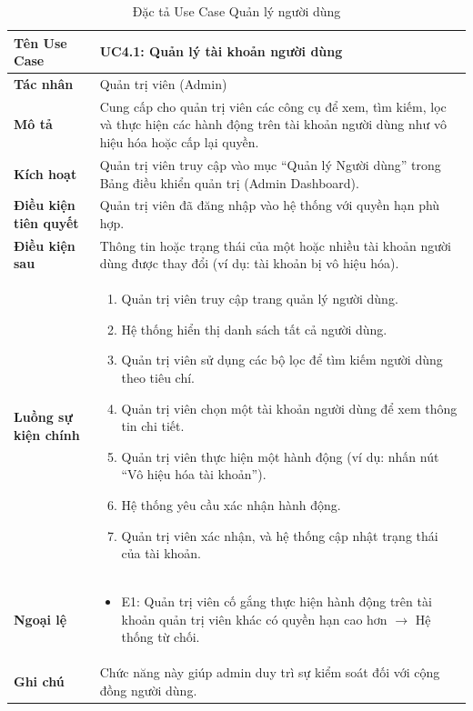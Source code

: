 \begin{table}[H]
\centering
\begin{tabularx}{\textwidth}{|l|X|}
\hline
\textbf{Tên Use Case} & \textbf{UC4.1: Quản lý tài khoản người dùng} \\ \hline
\textbf{Tác nhân} & Quản trị viên (Admin) \\ \hline
\textbf{Mô tả} & Cung cấp cho quản trị viên các công cụ để xem, tìm kiếm, lọc và thực hiện các hành động trên tài khoản người dùng như vô hiệu hóa hoặc cấp lại quyền. \\ \hline
\textbf{Kích hoạt} & Quản trị viên truy cập vào mục ``Quản lý Người dùng'' trong Bảng điều khiển quản trị (Admin Dashboard). \\ \hline
\textbf{Điều kiện tiên quyết} & Quản trị viên đã đăng nhập vào hệ thống với quyền hạn phù hợp. \\ \hline
\textbf{Điều kiện sau} & Thông tin hoặc trạng thái của một hoặc nhiều tài khoản người dùng được thay đổi (ví dụ: tài khoản bị vô hiệu hóa). \\ \hline
\textbf{Luồng sự kiện chính} & 
\begin{enumerate}
    \item Quản trị viên truy cập trang quản lý người dùng.
    \item Hệ thống hiển thị danh sách tất cả người dùng.
    \item Quản trị viên sử dụng các bộ lọc để tìm kiếm người dùng theo tiêu chí.
    \item Quản trị viên chọn một tài khoản người dùng để xem thông tin chi tiết.
    \item Quản trị viên thực hiện một hành động (ví dụ: nhấn nút ``Vô hiệu hóa tài khoản'').
    \item Hệ thống yêu cầu xác nhận hành động.
    \item Quản trị viên xác nhận, và hệ thống cập nhật trạng thái của tài khoản.
\end{enumerate} \\ \hline
\textbf{Ngoại lệ} & 
\begin{itemize}
    \item E1: Quản trị viên cố gắng thực hiện hành động trên tài khoản quản trị viên khác có quyền hạn cao hơn $\rightarrow$ Hệ thống từ chối.
\end{itemize} \\ \hline
\textbf{Ghi chú} & Chức năng này giúp admin duy trì sự kiểm soát đối với cộng đồng người dùng. \\ \hline
\end{tabularx}
\caption{Đặc tả Use Case Quản lý người dùng}
\end{table}

